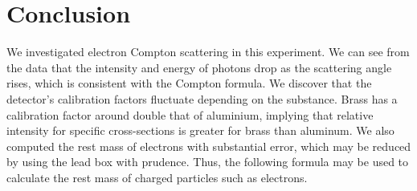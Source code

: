 \section{Conclusion}
	We investigated electron Compton scattering in this experiment. We can see from the data that the intensity and energy of photons drop as the scattering angle rises, which is consistent with the Compton formula. We discover that the detector's calibration factors fluctuate depending on the substance. Brass has a calibration factor around double that of aluminium, implying that relative intensity for specific cross-sections is greater for brass than aluminum. We also computed the rest mass of electrons with substantial error, which may be reduced by using the lead box with prudence. Thus, the following formula may be used to calculate the rest mass of charged particles such as electrons.
